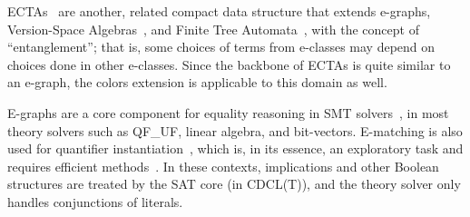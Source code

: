 ECTAs~\cite{Koppel22,Koppel23} are another, related compact data structure that extends e-graphs, Version-Space Algebras~\cite{DBLP:conf/icml/LauDW00,ML2003:Programming}, and Finite Tree Automata~\cite{DBLP:journals/pacmpl/0001M17},
with the concept of ``entanglement'';
that is, some choices of terms from e-classes
may depend on choices done in other e-classes.
Since the backbone of ECTAs is quite similar to an e-graph, the colors extension is applicable to this domain as well.

E-graphs are a core component for equality reasoning in SMT solvers~\cite{z3,DBLP:conf/tacas/BarbosaBBKLMMMN22}, in most theory solvers such as QF\_UF, linear algebra, and bit-vectors.
E-matching is also used for quantifier instantiation~\cite{DBLP:conf/tacas/NiemetzPRBT21}, which is, in its essence, an exploratory task and requires efficient methods~\cite{DBLP:conf/cade/MouraB07}.
In these contexts, implications and other Boolean structures are treated by the SAT core (in CDCL(T)), and the theory solver only handles conjunctions of literals.
